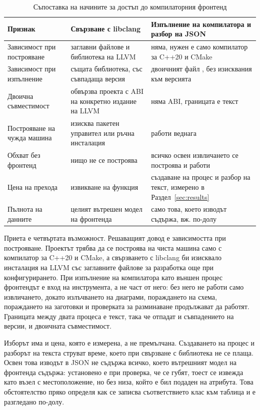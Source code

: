 \begin{table}[H]
\caption{Съпоставка на начините за достъп до компилаторния фронтенд}
\label{tab:frontend}
\centering
\fontsize{11}{13}\selectfont
\begin{tabular}{@{}L{3.6cm}L{4.6cm}L{4.6cm}@{}}
\toprule
\textbf{Признак} & \textbf{Свързване с libclang} & \textbf{Изпълнение на компилатора и разбор на JSON} \\
\midrule
Зависимост при построяване & заглавни файлове и библиотека на LLVM &
    няма, нужен е само компилатор за C++20 и CMake \\
Зависимост при изпълнение & същата библиотека, със съвпадаща версия &
    двоичният файл , без изисквания към версията \\
Двоична съвместимост & обвързва проекта с ABI на конкретно издание на LLVM &
    няма ABI, границата е текст \\
Построяване на чужда машина & изисква пакетен управител или ръчна инсталация &
    работи веднага \\
Обхват без фронтенд & нищо не се построява &
    всичко освен извличането се построява и работи \\
Цена на прехода & извикване на функция &
    създаване на процес и разбор на текст, измерено в Раздел~\ref{sec:results} \\
Пълнота на данните & целият вътрешен модел на фронтенда &
    само това, което изводът съдържа, вж. по-долу \\
\bottomrule
\end{tabular}
\end{table}

Приета е четвъртата възможност. Решаващият довод е зависимостта при построяване. Проектът
трябва да се построява на чиста машина само с компилатор за C++20 и CMake, а свързването
с libclang би изисквало инсталация на LLVM със заглавните файлове за разработка още при
конфигурирането. При изпълнение на компилатора като външен процес фронтендът е вход на
инструмента, а не част от него: без него не работи само извличането, докато излъчването
на диаграми, пораждането на схема, пораждането на заготовки и проверката за разминаване
продължават да работят. Границата между двата процеса е текст, така че отпадат и
съвпадението на версии, и двоичната съвместимост.

Изборът има и цена, която е измерена, а не премълчана. Създаването на процес и разборът
на текста струват време, което при свързване с библиотека не се плаща. Освен това изводът
в JSON не съдържа всичко, което вътрешният модел на фронтенда съдържа: установено е при
проверка, че  се губят, тоест  се
извежда като възел с местоположение, но без низа, който е бил подаден на атрибута. Това
обстоятелство пряко определя как се записва съответствието клас към таблица и е разгледано
по-долу.

